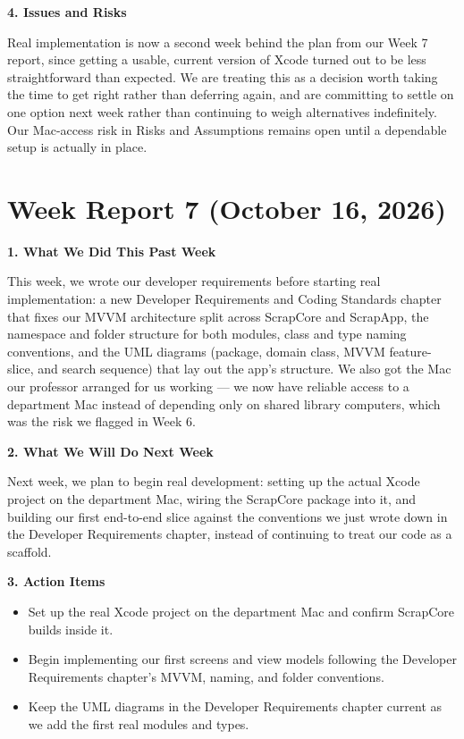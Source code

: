 \noindent\textbf{4. Issues and Risks}

Real implementation is now a second week behind the plan from our Week 7 report, since getting a usable, current version of Xcode turned out to be less straightforward than expected. We are treating this as a decision worth taking the time to get right rather than deferring again, and are committing to settle on one option next week rather than continuing to weigh alternatives indefinitely. Our Mac-access risk in Risks and Assumptions remains open until a dependable setup is actually in place.

\section{Week Report 7 (October 16, 2026)}

\noindent\textbf{1. What We Did This Past Week}

This week, we wrote our developer requirements before starting real implementation: a new Developer Requirements and Coding Standards chapter that fixes our MVVM architecture split across ScrapCore and ScrapApp, the namespace and folder structure for both modules, class and type naming conventions, and the UML diagrams (package, domain class, MVVM feature-slice, and search sequence) that lay out the app's structure. We also got the Mac our professor arranged for us working --- we now have reliable access to a department Mac instead of depending only on shared library computers, which was the risk we flagged in Week 6.

\noindent\textbf{2. What We Will Do Next Week}

Next week, we plan to begin real development: setting up the actual Xcode project on the department Mac, wiring the ScrapCore package into it, and building our first end-to-end slice against the conventions we just wrote down in the Developer Requirements chapter, instead of continuing to treat our code as a scaffold.

\noindent\textbf{3. Action Items}
\begin{itemize}
\item Set up the real Xcode project on the department Mac and confirm ScrapCore builds inside it.
\item Begin implementing our first screens and view models following the Developer Requirements chapter's MVVM, naming, and folder conventions.
\item Keep the UML diagrams in the Developer Requirements chapter current as we add the first real modules and types.
\end{itemize}

